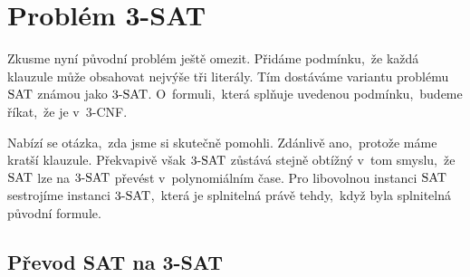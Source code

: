 \section{Problém 3-SAT}\label{sec:3sat}

Zkusme nyní původní problém ještě omezit. Přidáme podmínku,~že každá klauzule může obsahovat nejvýše tři literály. Tím dostáváme variantu problému \ensuremath{\SAT} známou jako \emph{\ensuremath{\THREESAT}}. O~formuli,~která splňuje uvedenou podmínku,~budeme říkat,~že je v~3-CNF.


Nabízí se otázka,~zda jsme si skutečně pomohli. Zdánlivě ano,~protože máme kratší klauzule. Překvapivě však \ensuremath{\THREESAT} zůstává stejně obtížný v~tom smyslu,~že \ensuremath{\SAT} lze na \ensuremath{\THREESAT} převést v~polynomiálním čase. Pro libovolnou instanci \ensuremath{\SAT} sestrojíme instanci \ensuremath{\THREESAT},~která je splnitelná právě tehdy,~když byla splnitelná původní formule.

\subsection{Převod SAT na 3-SAT}\label{subsec:prevod_sat_3sat}

